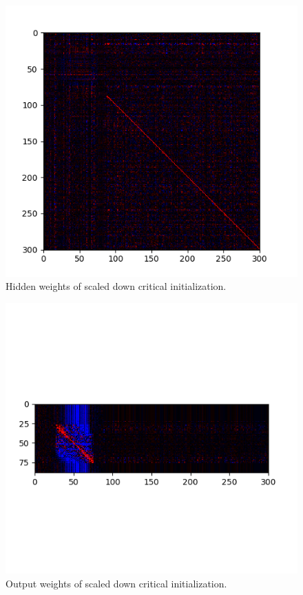 \documentclass{article}
\begin{document}
\begin{figure}
    \centering
    \includegraphics{figures/scrit_lds_hid_weights.png}
    \caption{Hidden weights of scaled down critical initialization.}
\end{figure}

\begin{figure}
    \centering
    \includegraphics{figures/scrit_lds_out_weights.png}
    \caption{Output weights of scaled down critical initialization.}
\end{figure}
\end{document}
